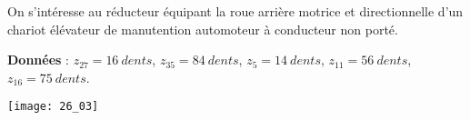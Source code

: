 \normaltrue \difficilefalse \tdifficilefalse
\correctiontrue



\setcounter{question}{0}
\ifcorrection
\else
{}
\fi

\ifprof
\else
On s’intéresse au réducteur équipant la roue arrière motrice et directionnelle d’un chariot élévateur de manutention automoteur à conducteur non porté. 


\textbf{Données }: $z_{27} = \SI{16}{dents}$, $z_{35} = \SI{84}{dents}$, $z_{5} = \SI{14}{dents}$, $z_{11} = \SI{56}{dents}$, $z_{16} = \SI{75}{dents}$. 

\fi


\ifprof
\else
\begin{marginfigure}
\texttt{[image: 26\_03]}
\end{marginfigure}
\fi
%

%


